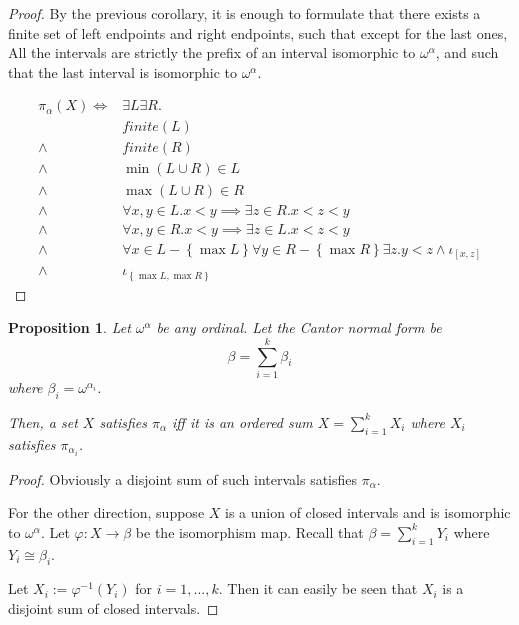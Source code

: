 \documentclass{article}
\newtheorem{proposition}{Proposition}
\newcommand{\parens}[1]{\left( {#1} \right)}
\newcommand{\brackets}[1]{\left[ {#1} \right]}
\newcommand{\braces}[1]{\left\{ {#1} \right\}}
\newcommand{\ii}[1]{{\iota}_{#1}}
\newcommand{\pp}[1]{{\pi}_{#1}}
\begin{document}
\begin{proof}
    By the previous corollary,
    it is enough to formulate that there
    exists a finite set of left endpoints and right endpoints,
    such that except for the last ones,
    All the intervals are strictly the prefix of
    an interval isomorphic to $\omega^\alpha$,
    and such that the last interval is
    isomorphic to $\omega^\alpha$.

    \begin{equation}
        \begin{split}
            \pp{\alpha} \parens{X}  \iff & \exists L \exists R.
        \\        & finite \parens{L}
        \\ \wedge & finite \parens{R}
        \\ \wedge & \min \parens{L \cup R} \in L
        \\ \wedge & \max \parens{L \cup R} \in R
        \\ \wedge &
        \forall x, y \in L. x < y \implies \exists z \in R. x < z < y
        \\ \wedge &
        \forall x, y \in R. x < y \implies \exists z \in L. x < z < y
        \\ \wedge &
        {
            \forall x \in L - \braces{\max L}
            \forall y \in R - \braces{\max R}
            \exists z. y < z \wedge \ii{\brackets{x, z}}
        }
        \\ \wedge & \ii{\braces{\max L, \max R}}
        \end{split}
    \end{equation}

\end{proof}

\begin{proposition}
    Let $\omega^\alpha$ be any ordinal.
    Let the Cantor normal form be
    $$\beta = \sum_{i=1}^k \beta_i$$ where $\beta_i = \omega^{\alpha_i}$.

    Then, a set $X$ satisfies $\pp{\alpha}$ iff it is an ordered sum
    $X = \sum_{i=1}^k X_i$ where $X_i$ satisfies $\pp{\alpha_i}$.
\end{proposition}

\begin{proof}
    Obviously a disjoint sum of such
    intervals satisfies $\pp{\alpha}$.

    For the other direction, suppose $X$ is a union
    of closed intervals and
    is isomorphic to $\omega^\alpha$.
    Let $\varphi : X \to \beta$ be the isomorphism map.
    Recall that $\beta = \sum_{i=1}^k Y_i$ where
    $Y_i \cong \beta_i$.
    
    Let $X_i := \varphi^{-1}(Y_i)$ for $i = 1, ..., k$.
    Then it can easily be seen that $X_i$ is
    a disjoint sum of closed intervals.
\end{proof}
\end{document}
